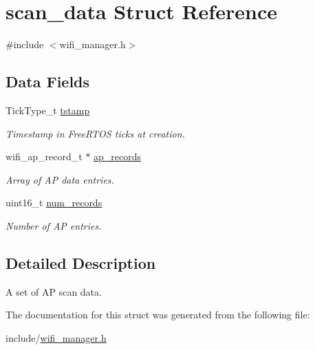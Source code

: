 \hypertarget{structscan__data}{}\section{scan\+\_\+data Struct Reference}
\label{structscan__data}


{\ttfamily \#include $<$wifi\+\_\+manager.\+h$>$}

\subsection*{Data Fields}
\begin{DoxyCompactItemize}
\item 
\mbox{\label{structscan__data_aaee4dc743ef893f87be2457deea44b70}} 
Tick\+Type\+\_\+t \mbox{\hyperlink{structscan__data_aaee4dc743ef893f87be2457deea44b70}{tstamp}}
\begin{DoxyCompactList}\small\item\em Timestamp in Free\+R\+T\+OS ticks at creation. \end{DoxyCompactList}\item 
\mbox{\label{structscan__data_a93613cdc0d1a2e7b9e68f9a001beaf21}} 
wifi\+\_\+ap\+\_\+record\+\_\+t $\ast$ \mbox{\hyperlink{structscan__data_a93613cdc0d1a2e7b9e68f9a001beaf21}{ap\+\_\+records}}
\begin{DoxyCompactList}\small\item\em Array of AP data entries. \end{DoxyCompactList}\item 
\mbox{\label{structscan__data_a477cdf33bfcdc8ecfcc058ae22edd2f1}} 
uint16\+\_\+t \mbox{\hyperlink{structscan__data_a477cdf33bfcdc8ecfcc058ae22edd2f1}{num\+\_\+records}}
\begin{DoxyCompactList}\small\item\em Number of AP entries. \end{DoxyCompactList}\end{DoxyCompactItemize}


\subsection{Detailed Description}
A set of AP scan data. 

The documentation for this struct was generated from the following file\+:\begin{DoxyCompactItemize}
\item 
include/\mbox{\hyperlink{wifi__manager_8h}{wifi\+\_\+manager.\+h}}\end{DoxyCompactItemize}
